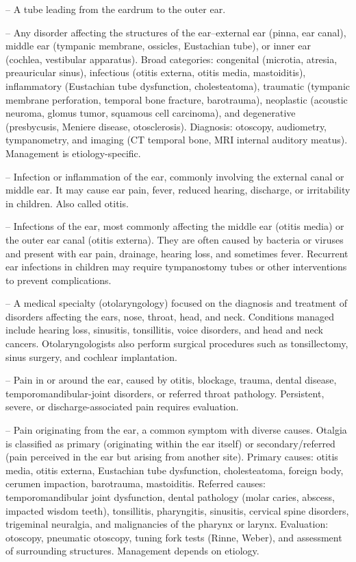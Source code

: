 -- A tube leading from the eardrum to the outer ear.

-- Any disorder affecting the structures of the ear--external ear (pinna, ear canal), middle ear (tympanic membrane, ossicles, Eustachian tube), or inner ear (cochlea, vestibular apparatus). Broad categories: congenital (microtia, atresia, preauricular sinus), infectious (otitis externa, otitis media, mastoiditis), inflammatory (Eustachian tube dysfunction, cholesteatoma), traumatic (tympanic membrane perforation, temporal bone fracture, barotrauma), neoplastic (acoustic neuroma, glomus tumor, squamous cell carcinoma), and degenerative (presbycusis, Meniere disease, otosclerosis). Diagnosis: otoscopy, audiometry, tympanometry, and imaging (CT temporal bone, MRI internal auditory meatus). Management is etiology-specific.

-- Infection or inflammation of the ear, commonly involving the external canal or middle ear. It may cause ear pain, fever, reduced hearing, discharge, or irritability in children. Also called otitis.

-- Infections of the ear, most commonly affecting the middle ear (otitis media) or the outer ear canal (otitis externa). They are often caused by bacteria or viruses and present with ear pain, drainage, hearing loss, and sometimes fever. Recurrent ear infections in children may require tympanostomy tubes or other interventions to prevent complications.

-- A medical specialty (otolaryngology) focused on the diagnosis and treatment of disorders affecting the ears, nose, throat, head, and neck. Conditions managed include hearing loss, sinusitis, tonsillitis, voice disorders, and head and neck cancers. Otolaryngologists also perform surgical procedures such as tonsillectomy, sinus surgery, and cochlear implantation.

-- Pain in or around the ear, caused by otitis, blockage, trauma, dental disease, temporomandibular-joint disorders, or referred throat pathology. Persistent, severe, or discharge-associated pain requires evaluation.

-- Pain originating from the ear, a common symptom with diverse causes. Otalgia is classified as primary (originating within the ear itself) or secondary/referred (pain perceived in the ear but arising from another site). Primary causes: otitis media, otitis externa, Eustachian tube dysfunction, cholesteatoma, foreign body, cerumen impaction, barotrauma, mastoiditis. Referred causes: temporomandibular joint dysfunction, dental pathology (molar caries, abscess, impacted wisdom teeth), tonsillitis, pharyngitis, sinusitis, cervical spine disorders, trigeminal neuralgia, and malignancies of the pharynx or larynx. Evaluation: otoscopy, pneumatic otoscopy, tuning fork tests (Rinne, Weber), and assessment of surrounding structures. Management depends on etiology.

